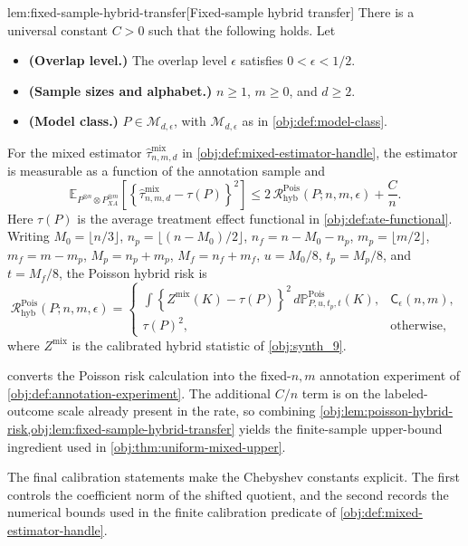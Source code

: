 \begin{lemmav}{lem:fixed-sample-hybrid-transfer}[Fixed-sample hybrid transfer]
There is a universal constant \(C>0\) such that the following holds.  Let
\begin{itemize}
\item \textbf{(Overlap level.)} The overlap level \(\epsilon\) satisfies \(0<\epsilon<1/2\).
\item \textbf{(Sample sizes and alphabet.)} \(n\ge 1\), \(m\ge 0\), and \(d\ge 2\).
\item \textbf{(Model class.)} \(P\in\mathcal M_{d,\epsilon}\), with \(\mathcal M_{d,\epsilon}\) as in \cref{obj:def:model-class}.
\end{itemize}
For the mixed estimator \(\widehat\tau^{\mathrm{mix}}_{n,m,d}\) in \cref{obj:def:mixed-estimator-handle}, the estimator is measurable as a function of the annotation sample and
\[
\mathbb E_{P^{\otimes n}\otimes P_{XA}^{\otimes m}}
\left[
  \left\{\widehat\tau^{\mathrm{mix}}_{n,m,d}-\tau(P)\right\}^2
\right]
\le
2\,\mathcal R^{\mathrm{Pois}}_{\mathrm{hyb}}(P;n,m,\epsilon)
+\frac{C}{n}.
\]
Here \(\tau(P)\) is the average treatment effect functional in \cref{obj:def:ate-functional}.  Writing
\(M_0=\lfloor n/3\rfloor\), \(n_p=\lfloor(n-M_0)/2\rfloor\),
\(n_f=n-M_0-n_p\), \(m_p=\lfloor m/2\rfloor\), \(m_f=m-m_p\),
\(M_p=n_p+m_p\), \(M_f=n_f+m_f\), \(u=M_0/8\), \(t_p=M_p/8\), and
\(t=M_f/8\), the Poisson hybrid risk is
\[
\mathcal R^{\mathrm{Pois}}_{\mathrm{hyb}}(P;n,m,\epsilon)
=
\begin{cases}
\displaystyle
\int
\left\{
  Z^{\mathrm{mix}}(K)-\tau(P)
\right\}^2
\,d\mathbb P^{\mathrm{Pois}}_{P,u,t_p,t}(K),
&
\mathsf C_\epsilon(n,m),\\[1.2em]
\displaystyle
\tau(P)^2,
&
\text{otherwise,}
\end{cases}
\]
where \(Z^{\mathrm{mix}}\) is the calibrated hybrid statistic of \cref{obj:synth_9}.
\end{lemmav}

 converts the Poisson risk calculation into the fixed-\(n,m\) annotation experiment of \cref{obj:def:annotation-experiment}. The additional \(C/n\) term is on the labeled-outcome scale already present in the rate, so combining \cref{obj:lem:poisson-hybrid-risk,obj:lem:fixed-sample-hybrid-transfer} yields the finite-sample upper-bound ingredient used in \cref{obj:thm:uniform-mixed-upper}.

The final calibration statements make the Chebyshev constants explicit. The first controls the coefficient norm of the shifted quotient, and the second records the numerical bounds used in the finite calibration predicate of \cref{obj:def:mixed-estimator-handle}.

